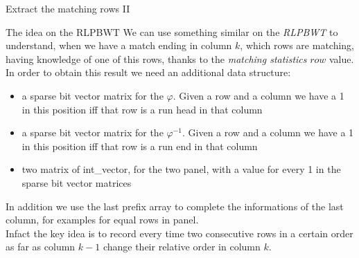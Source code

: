 \documentclass{beamer}
\begin{document}
\begin{frame}{Extract the matching rows II}
  \begin{block}{The idea on the RLPBWT}
    We can use something similar on the \textit{RLPBWT} to understand, when we
    have a match ending in column $k$, which rows are matching, having knowledge
    of one of this rows, thanks to the \textit{matching statistics} $row$
    value.\\
    In order to obtain this result we need an additional data structure:
    \begin{itemize}
      \item a sparse bit vector matrix for the $\varphi$. Given a row and a
      column we have a 1 in this position iff that row is a run head in that
      column 
      \item a sparse bit vector matrix for the $\varphi^{-1}$. Given a row and a
      column we have a 1 in this position iff that row is a run end in that
      column 
      \item two matrix of int\_vector, for the two panel, with a value for every
      1 in the sparse bit vector matrices
    \end{itemize}
    In addition we use the last prefix array to complete the informations of the
    last column, for examples for equal rows in panel.\\
    Infact the key idea is to record every time two consecutive rows in a
    certain order as far as column $k-1$ change their relative order in column
    $k$. 
  \end{block}
\end{frame}
\end{document}
